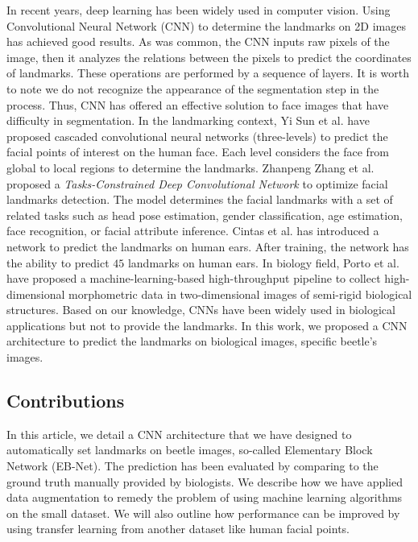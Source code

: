 \documentclass[review]{elsarticle}
\begin{document}
In recent years, deep learning has been widely used in computer vision. Using Convolutional Neural Network (CNN) to determine the landmarks on 2D images has achieved good results. As was common, the CNN inputs raw pixels of the image, then it analyzes the relations between the pixels to predict the coordinates of landmarks. These operations are performed by a sequence of layers. It is worth to note we do not recognize the appearance of the segmentation step in the process. Thus, CNN has offered an effective solution to face images that have difficulty in segmentation. In the landmarking context, Yi Sun et al. \cite{sun2013deep} have proposed cascaded convolutional neural networks (three-levels) to predict the facial points of interest on the human face. Each level considers the face from global to local regions to determine the landmarks. Zhanpeng Zhang et al. \cite{zhang2014facial} proposed a \textit{Tasks-Constrained Deep Convolutional Network} to optimize facial landmarks detection. The model determines the facial landmarks with a set of related tasks such as head pose estimation, gender classification, age estimation, face recognition, or facial attribute inference. Cintas et al. \cite{cintas2016automatic} has introduced a network to predict the landmarks on human ears. After training, the network has the ability to predict $45$ landmarks on human ears. In biology field, Porto et al. \cite{porto2020ml} have proposed a machine-learning-based high-throughput pipeline to collect high-dimensional morphometric data in two-dimensional images of semi-rigid biological structures. Based on our knowledge, CNNs have been widely used in biological applications but not to provide the landmarks. In this work, we proposed a CNN architecture to predict the landmarks on biological images, specific beetle's images.

\subsection{Contributions}
In this article, we detail a CNN architecture that we have designed to automatically set landmarks on beetle images, so-called Elementary Block Network (EB-Net). The prediction has been evaluated by comparing to the ground truth manually provided by biologists. We describe how we have applied data augmentation to remedy the problem of using machine learning algorithms on the small dataset. We will also outline how performance can be improved by using transfer learning from another dataset like human facial points.
\end{document}
